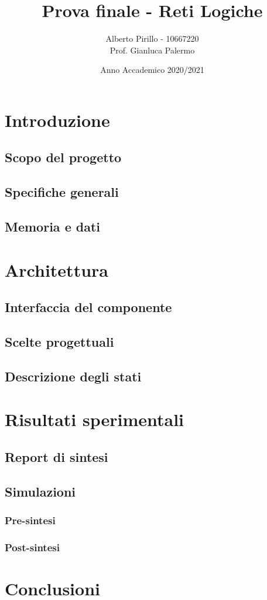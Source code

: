 \documentclass[a4paper, 12pt]{article}
\title{Prova finale - Reti Logiche}
\author{Alberto Pirillo - 10667220 \\ Prof. Gianluca Palermo}
\date{Anno Accademico 2020/2021}
\begin{document}
\maketitle
\tableofcontents
\pagebreak

\section{Introduzione}
\subsection{Scopo del progetto}
\subsection{Specifiche generali}
\subsection{Memoria e dati}

\section{Architettura}
\subsection{Interfaccia del componente}
\subsection{Scelte progettuali}
\subsection{Descrizione degli stati}

\section{Risultati sperimentali}
\subsection{Report di sintesi}
\subsection{Simulazioni}
\subsubsection{Pre-sintesi}
\subsubsection{Post-sintesi}

\section{Conclusioni}
\end{document}
